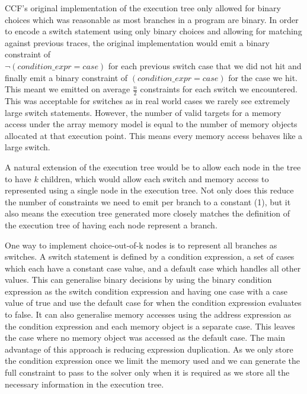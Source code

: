 \documentclass[12pt,twoside]{report}
\begin{document}
CCF's original implementation of the execution tree only allowed for binary choices which was reasonable as most branches in a program are binary. In order to encode a switch statement using only binary choices and allowing for matching against previous traces, the original implementation would emit a binary constraint of \\$\neg{(condition\_expr = case)}$ for each previous switch case that we did not hit and finally emit a binary constraint of $(condition\_expr = case)$ for the case we hit. This meant we emitted on average $\frac{n}{2}$ constraints for each switch we encountered. This was acceptable for switches as in real world cases we rarely see extremely large switch statements. However, the number of valid targets for a memory access under the array memory model is equal to the number of memory objects allocated at that execution point. This means every memory access behaves like a large switch.

A natural extension of the execution tree would be to allow each node in the tree to have $k$ children, which would allow each switch and memory access to represented using a single node in the execution tree. Not only does this reduce the number of constraints we need to emit per branch to a constant (1), but it also means the execution tree generated more closely matches the definition of the execution tree of having each node represent a branch.

One way to implement choice-out-of-k nodes is to represent all branches as switches. A switch statement is defined by a condition expression, a set of cases which each have a constant case value, and a default case which handles all other values. This can generalise binary decisions by using the binary condition expression as the switch condition expression and having one case with a case value of true and use the default case for when the condition expression evaluates to false. It can also generalise memory accesses using the address expression as the condition expression and each memory object is a separate case. This leaves the case where no memory object was accessed as the default case. The main advantage of this approach is reducing expression duplication. As we only store the condition expression once we limit the memory used and we can generate the full constraint to pass to the solver only when it is required as we store all the necessary information in the execution tree.
\end{document}
